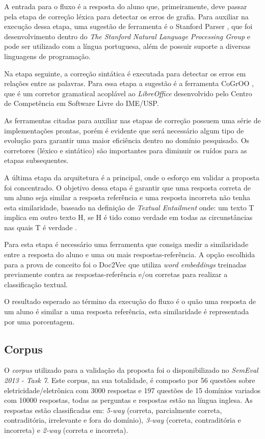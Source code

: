 \documentclass[conference]{IEEEtran}
\begin{document}
A entrada para o fluxo é a resposta do aluno que, primeiramente, deve passar pela etapa de correção léxica para detectar os erros de grafia. Para auxiliar na execução dessa etapa, uma sugestão de ferramenta é o Stanford Parser \cite{StanfordParser:2005}, que foi desenvolvimento dentro do \textit{The Stanford Natural Language Processing Group} e pode ser utilizado com a língua portuguesa, além de possuir suporte a diversas linguagens de programação. 

Na etapa seguinte, a correção sintática é executada para detectar os erros em relações entre as palavras. Para essa etapa a sugestão é a ferramenta CoGrOO \cite{CCSL:2013}, que é um corretor gramatical acoplável ao \textit{LibreOffice} desenvolvido pelo Centro de Competência em Software Livre do IME/USP. 

As ferramentas citadas para auxiliar nas etapas de correção possuem uma série de implementações prontas, porém é evidente que será necessário algum tipo de evolução para garantir uma maior eficiência dentro no domínio pesquisado. Os corretores (léxico e sintático) são importantes para diminuir os ruídos para as etapas subsequentes.

A última etapa da arquitetura é a principal, onde o esforço em validar a proposta foi concentrado. O objetivo dessa etapa é garantir que uma resposta correta de um aluno seja similar a resposta referência e uma resposta incorreta não tenha esta similaridade, baseado na definição de \textit{Textual Entailment} onde: um texto T implica em outro texto H, se H é tido como verdade em todas as circunstâncias nas quais T é verdade \cite{Dagan:2006}.

Para esta etapa é necessário uma ferramenta que consiga medir a similaridade entre a resposta do aluno e uma ou mais respostas-referência. A opção escolhida para a prova de conceito foi o Doc2Vec \cite{Mikolov:2016} que utiliza \textit{word embeddings} treinadas previamente contra as respostas-referência e/ou corretas para realizar a classificação textual. 

O resultado esperado ao término da execução do fluxo é o quão uma resposta de um aluno é similar a uma resposta referência, esta similaridade é representada por uma porcentagem.

\subsection{Corpus}
O \textit{corpus} utilizado para a validação da proposta foi o disponibilizado no \textit{SemEval 2013 - Task 7}\cite{Dzikovska:2013}. Este corpus, na sua totalidade,  é composto por 56 questões sobre eletricidade/eletrônica com 3000 respostas e 197 questões de 15 domínios variados com 10000 respostas, todas as perguntas e respostas estão na língua inglesa. As respostas estão classificadas em: \textit{5-way} (correta, parcialmente correta, contraditória, irrelevante e fora do domínio), \textit{3-way} (correta, contraditória e incorreta) e \textit{2-way} (correta e incorreta).
\end{document}
